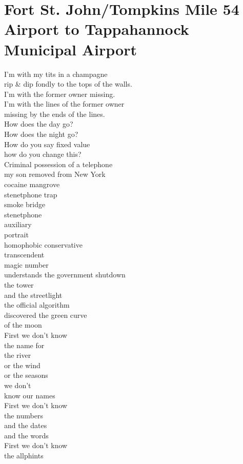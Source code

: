 \documentclass[smalldemyvopaper,11pt,twoside,onecolumn,openright,extrafontsizes]{memoir}
\begin{document}
\chapter{Fort St. John/Tompkins Mile 54 Airport to Tappahannock Municipal Airport}
I'm with my tits in a champagne
\\rip \& dip fondly to the tops of the walls.
\\I'm with the former owner missing.
\\I'm with the lines of the former owner
\\missing by the ends of the lines.
\\How does the day go?
\\How does the night go?
\\How do you say fixed value
\\how do you change this?
\\Criminal possession of a telephone
\\my son removed from New York
\\cocaine mangrove
\\stenetphone trap
\\smoke bridge
\\stenetphone
\\auxiliary
\\portrait
\\homophobic conservative
\\transcendent
\\magic number
\\understands the government shutdown
\\the tower
\\and the streetlight
\\the official algorithm
\\discovered the green curve
\\of the moon
\\First we don't know
\\the name for
\\the river
\\or the wind
\\or the seasons
\\we don't
\\know our names
\\First we don't know
\\the numbers
\\and the dates
\\and the words
\\First we don't know
\\the allphints
\end{document}
